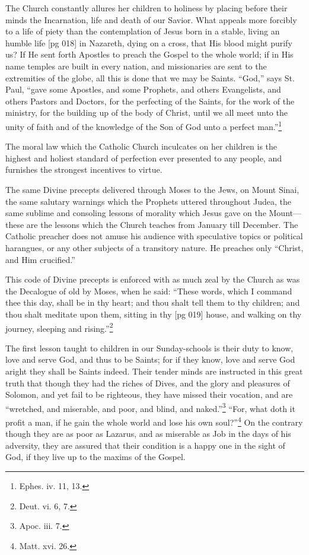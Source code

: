The Church constantly allures her children to
holiness by placing before their minds the Incarnation,
life and death of our Savior. What appeals
more forcibly to a life of piety than the contemplation
of Jesus born in a stable, living an humble life
[pg 018]
in Nazareth, dying on a cross, that His blood might
purify us? If He sent forth Apostles to preach
the Gospel to the whole world; if in His name
temples are built in every nation, and missionaries
are sent to the extremities of the globe, all
this is done that we may be Saints. “God,” says
St. Paul, “gave some Apostles, and some Prophets,
and others Evangelists, and others Pastors and
Doctors, for the perfecting of the Saints, for the
work of the ministry, for the building up of the
body of Christ, until we all meet unto the unity of
faith and of the knowledge of the Son of God unto
a perfect man.”\footnote{Ephes. iv. 11, 13.}

The moral law which the Catholic Church inculcates
on her children is the highest and holiest
standard of perfection ever presented to any people,
and furnishes the strongest incentives to
virtue.

The same Divine precepts delivered through
Moses to the Jews, on Mount Sinai, the same
salutary warnings which the Prophets uttered
throughout Judea, the same sublime and consoling
lessons of morality which Jesus gave on the
Mount—these are the lessons which the Church
teaches from January till December. The Catholic
preacher does not amuse his audience with
speculative topics or political harangues, or any
other subjects of a transitory nature. He preaches
only “Christ, and Him crucified.”

This code of Divine precepts is enforced with as
much zeal by the Church as was the Decalogue
of old by Moses, when he said: “These words,
which I command thee this day, shall be in thy
heart; and thou shalt tell them to thy children;
and thou shalt meditate upon them, sitting in thy
[pg 019]
house, and walking on thy journey, sleeping and
rising.”\footnote{Deut. vi. 6, 7.}

The first lesson taught to children in our Sunday-schools
is their duty to know, love and serve
God, and thus to be Saints; for if they know, love
and serve God aright they shall be Saints indeed.
Their tender minds are instructed in this great
truth that though they had the riches of Dives, and
the glory and pleasures of Solomon, and yet fail to
be righteous, they have missed their vocation, and
are “wretched, and miserable, and poor, and blind,
and naked.”\footnote{Apoc. iii.
7.} “For, what doth it profit a man, if
he gain the whole world and lose his own soul?”\footnote{Matt.
xvi. 26.}
On the contrary though they are as poor as Lazarus,
and as miserable as Job in the days of his adversity,
they are assured that their condition is a
happy one in the sight of God, if they live up to
the maxims of the Gospel.

